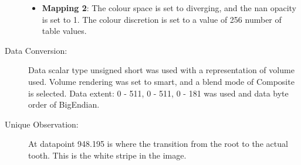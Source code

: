 \begin{description}
	\begin{itemize}
		\tightlist
		\item
		\textbf{Mapping 2}: 
		\hfill \break
			The colour space is set to diverging, and the nan opacity is set to 1. The colour discretion is set to a value of 256 number of table values.
	\end{itemize}
	\item[Data Conversion:] 
	\hfill \break
		Data scalar type unsigned short was used with a representation of volume used. Volume rendering was set to smart, and a blend mode of Composite is selected. Data extent: 0 - 511, 0 - 511, 0 - 181 was used and data byte order of BigEndian.
	\item[Unique Observation:]
	\hfill \break
		At datapoint 948.195 is where the transition from the root to the actual tooth. This is the white stripe in the image.
	
\end{description}